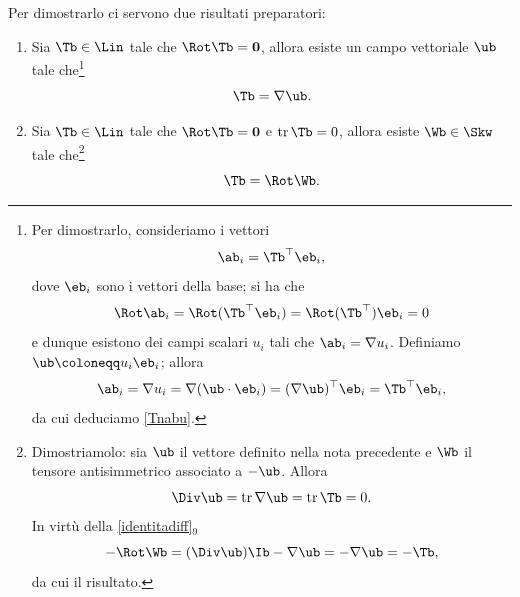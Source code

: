 Per dimostrarlo ci servono due risultati  preparatori:
\begin{enumerate}
	\item Sia $\Tb\in \Lin$ tale che $\Rot \Tb =\mathbf{0}$, allora esiste un campo vettoriale $\ub$ tale che\footnote{Per dimostrarlo, consideriamo i vettori
		\begin{equation}
			\ab_i =\Tb^\top \eb_i,
		\end{equation}
		dove $\eb_i$ sono i vettori della base; si ha che
		\begin{equation}
			\Rot \ab_i= \Rot (\Tb^\top \eb_i)=\Rot(\Tb^\top)\eb_i=0
		\end{equation}
		e dunque esistono dei campi scalari $u_i$ tali che $\ab_i=\nabla u_i$.
		Definiamo $\ub \coloneqq u_i \eb_i$; allora
		\begin{equation}
			\ab_i=\nabla u_i =\nabla(\ub \cdot \eb_i)=(\nabla \ub)^\top\eb_i=\Tb ^\top \eb_i,
		\end{equation}
		da cui deduciamo \eqref{Tnabu}.}
	\begin{equation}\label{Tnabu}
	\Tb=\nabla \ub.
	\end{equation}
\item Sia $\Tb \in \Lin$ tale che $\Rot \Tb=\mathbf{0}$ e $\operatorname{tr}\Tb=0$, allora esiste $\Wb \in \Skw$ tale che\footnote{
Dimostriamolo: sia $\ub$ il vettore definito nella nota precedente e $\Wb$ il tensore antisimmetrico associato a $-\ub$. Allora
\begin{equation}
	\Div \ub = \operatorname{tr}\nabla \ub =\operatorname{tr}\Tb =0.
\end{equation}
In  virtù della \eqref{identitadiff}$_9$
\begin{equation}
	-\Rot \Wb =(\Div \ub)\Ib-\nabla \ub=-\nabla \ub =-\Tb,
\end{equation}
da cui il risultato.
}
\begin{equation}
\Tb=\Rot \Wb.
\end{equation}
\end{enumerate}

